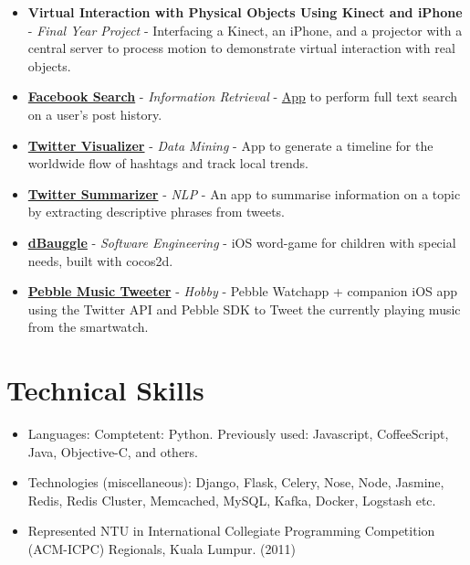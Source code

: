 \begin{itemize}
\item
  \textbf{Virtual Interaction with Physical Objects Using Kinect and
  iPhone} - \emph{Final Year Project} - Interfacing a Kinect, an iPhone,
  and a projector with a central server to process motion to demonstrate
  virtual interaction with real objects.
\item
  \href{https://github.com/arnavk/FacebookSearch}{\textbf{Facebook
  Search}} - \emph{Information Retrieval} -
  \href{http://facebook-search.herokuapp.com/}{App} to perform full text
  search on a user's post history.
\item
  \href{https://github.com/arnavk/Twitter-Visualiser}{\textbf{Twitter
  Visualizer}} - \emph{Data Mining} - App to generate a timeline for the
  worldwide flow of hashtags and track local trends.
\item
  \href{https://github.com/arnavk/NLP}{\textbf{Twitter Summarizer}} -
  \emph{NLP} - An app to summarise information on a topic by extracting
  descriptive phrases from tweets.
\item
  \href{https://itunes.apple.com/us/app/dbauggle!/id625981185?mt=8}{\textbf{dBauggle}}
  - \emph{Software Engineering} - iOS word-game for children with
  special needs, built with cocos2d.
\item
  \href{https://github.com/arnavk/Pebble-MusicTweeter}{\textbf{Pebble
  Music Tweeter}} - \emph{Hobby} - Pebble Watchapp + companion iOS app
  using the Twitter API and Pebble SDK to Tweet the currently playing
  music from the smartwatch.
\end{itemize}

\section{Technical Skills}\label{technical-skills}

\begin{itemize}
\tightlist
\item
  Languages: Comptetent: Python. Previously used: Javascript,
  CoffeeScript, Java, Objective-C, and others.
\item
  Technologies (miscellaneous): Django, Flask, Celery, Nose, Node,
  Jasmine, Redis, Redis Cluster, Memcached, MySQL, Kafka, Docker,
  Logstash etc.
\item
  Represented NTU in International Collegiate Programming Competition
  (ACM-ICPC) Regionals, Kuala Lumpur. \hfill (2011)
\end{itemize}

